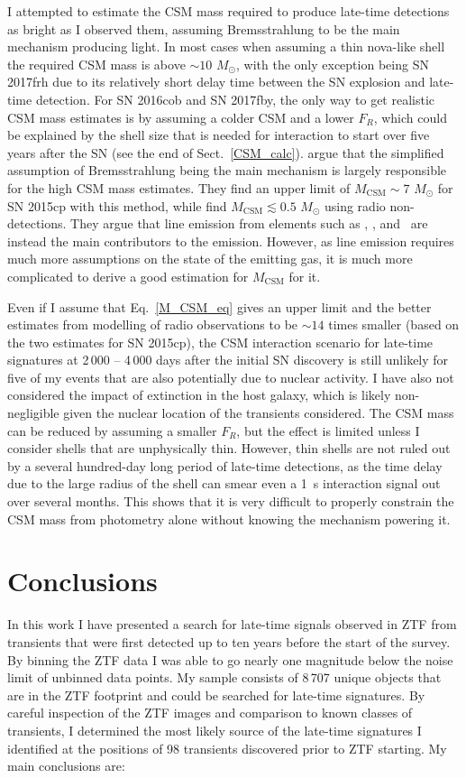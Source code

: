 \documentclass[a4paper,oneside,12pt, class=Latex/Classes/PhDthesisPSnPDF, crop=false]{standalone}
\begin{document}
I attempted to estimate the CSM mass required to produce late-time detections as bright as I observed them, assuming Bremsstrahlung to be the main mechanism producing light. In most cases when assuming a thin nova-like shell the required CSM mass is above $\sim 10$ $M_\odot$, with the only exception being SN 2017frh due to its relatively short delay time between the SN explosion and late-time detection. For SN 2016cob and SN 2017fby, the only way to get realistic CSM mass estimates is by assuming a colder CSM and a lower $F_R$, which could be explained by the shell size that is needed for interaction to start over five years after the SN (see the end of Sect.~\ref{CSM_calc}). \citet{2015cp} argue that the simplified assumption of Bremsstrahlung being the main mechanism is largely responsible for the high CSM mass estimates. They find an upper limit of $M_\text{CSM} \sim 7$ $M_\odot$ for SN 2015cp with this method, while \citet{2015cp_radio} find $M_\text{CSM} \lesssim 0.5$ $M_\odot$ using radio non-detections. They argue that line emission from elements such as , , and ~are instead the main contributors to the emission. However, as line emission requires much more assumptions on the state of the emitting gas, it is much more complicated to derive a good estimation for $M_\text{CSM}$ for it.

Even if I assume that Eq.~\ref{M_CSM_eq} gives an upper limit and the better estimates from modelling of radio observations to be $\sim14$ times smaller (based on the two estimates for SN 2015cp), the CSM interaction scenario for late-time signatures at 2\,000 -- 4\,000 days after the initial SN discovery is still unlikely for five of my events that are also potentially due to nuclear activity. I have also not considered the impact of extinction in the host galaxy, which is likely non-negligible given the nuclear location of the transients considered. The CSM mass can be reduced by assuming a smaller $F_R$, but the effect is limited unless I consider shells that are unphysically thin. However, thin shells are not ruled out by a several hundred-day long period of late-time detections, as the time delay due to the large radius of the shell can smear even a 1~s interaction signal out over several months. This shows that it is very difficult to properly constrain the CSM mass from photometry alone without knowing the mechanism powering it.

\section{Conclusions}
\label{Pre-ZTF_conclusions}
In this work I have presented a search for late-time signals observed in ZTF from transients that were first detected up to ten years before the start of the survey. By binning the ZTF data I was able to go nearly one magnitude below the noise limit of unbinned data points. My sample consists of 8\,707 unique objects that are in the ZTF footprint and could be searched for late-time signatures. By careful inspection of the ZTF images and comparison to known classes of transients, I determined the most likely source of the late-time signatures I identified at the positions of 98 transients discovered prior to ZTF starting. My main conclusions are:
\end{document}
